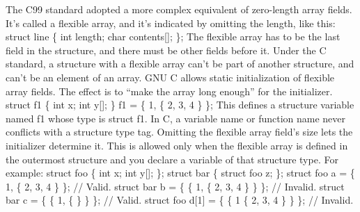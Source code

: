 \begin{infobox}[title=GNU C Language Manual - Flexible Array Fields]
The C99 standard adopted a more complex equivalent of zero-length array fields.
It’s called a flexible array, and it’s indicated by omitting the length, like this:
\newline
\newline
struct line
\{
  int length;
  char contents[];
\};
\newline
\newline
The flexible array has to be the last field in the structure, and there must be other fields before it.
\newline
\newline
Under the C standard, a structure with a flexible array can’t be part of another structure, and can’t be an element of an array.
\newline
\newline
GNU C allows static initialization of flexible array fields. The effect is to “make the array long enough” for the initializer.
\newline
\newline
struct f1 \{ int x; int y[]; \} f1 = \{ 1, \{ 2, 3, 4 \} \};
\newline
\newline
This defines a structure variable named f1 whose type is struct f1. In C, a variable name or function name never conflicts with a structure type tag.
\newline
\newline
Omitting the flexible array field’s size lets the initializer determine it. This is allowed only when the flexible array is defined in the outermost structure and you declare a variable of that structure type. For example:
\newline
\newline
struct foo \{ int x; int y[]; \};
struct bar \{ struct foo z; \};
\newline
\newline
struct foo a = \{ 1, \{ 2, 3, 4 \} \}; // Valid.
\newline
struct bar b = \{ \{ 1, \{ 2, 3, 4 \} \} \}; // Invalid.
\newline
struct bar c = \{ \{ 1, \{ \} \} \};            // Valid.
\newline
struct foo d[1] = \{ \{ 1 \{ 2, 3, 4 \} \} \};  // Invalid.
\end{infobox}

